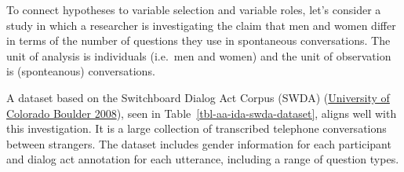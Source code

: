 \documentclass[
  letterpaper,
  DIV=11,
  numbers=noendperiod]{scrreport}
\theoremstyle{definition}
\theoremstyle{remark}
\begin{document}
To connect hypotheses to variable selection and variable roles, let's
consider a study in which a researcher is investigating the claim that
men and women differ in terms of the number of questions they use in
spontaneous conversations. The unit of analysis is individuals (i.e.~men
and women) and the unit of observation is (sponteanous) conversations.

A dataset based on the Switchboard Dialog Act Corpus (SWDA)
(\protect\hyperlink{ref-SWDA2008}{University of Colorado Boulder 2008}),
seen in Table~\ref{tbl-aa-ida-swda-dataset}, aligns well with this
investigation. It is a large collection of transcribed telephone
conversations between strangers. The dataset includes gender information
for each participant and dialog act annotation for each utterance,
including a range of question types.
\end{document}
